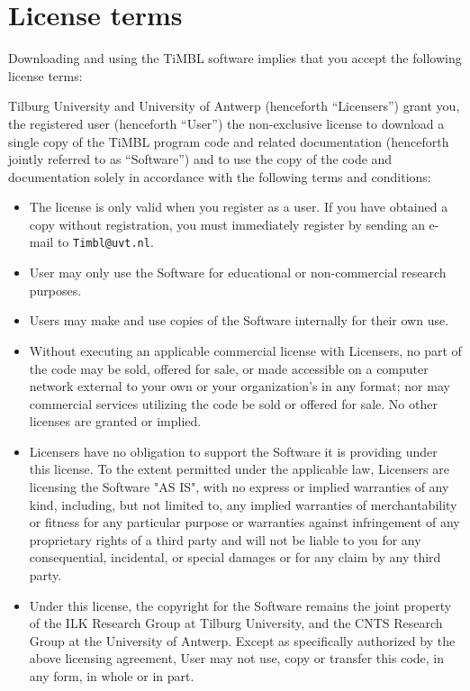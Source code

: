 \documentclass{report}
\begin{document}
\chapter{License terms}
\label{license}

Downloading and using the TiMBL software implies that you accept the
following license terms:

Tilburg University and University of Antwerp (henceforth
``Licensers'') grant you, the registered user (henceforth ``User'')
the non-exclusive license to download a single copy of the TiMBL
program code and related documentation (henceforth jointly referred to
as ``Software'') and to use the copy of the code and documentation
solely in accordance with the following terms and conditions:

\begin{itemize}

\item The license is only valid when you register as a user. If you
have obtained a copy without registration, you must immediately
register by sending an e-mail to {\tt Timbl@uvt.nl}.

\item User may only use the Software for educational or non-commercial
research purposes.

\item Users may make and use copies of the Software internally for
their own use.

\item Without executing an applicable commercial license with
Licensers, no part of the code may be sold, offered for sale, or made
accessible on a computer network external to your own or your
organization's in any format; nor may commercial services utilizing
the code be sold or offered for sale. No other licenses are granted or
implied.

\item Licensers have no obligation to support the Software it is
providing under this license.  To the extent permitted under the
applicable law, Licensers are licensing the Software "AS IS", with no
express or implied warranties of any kind, including, but not limited
to, any implied warranties of merchantability or fitness for any
particular purpose or warranties against infringement of any
proprietary rights of a third party and will not be liable to you for
any consequential, incidental, or special damages or for any claim by
any third party.

\item Under this license, the copyright for the Software remains the
joint property of the ILK Research Group at Tilburg University, and
the CNTS Research Group at the University of Antwerp.  Except as
specifically authorized by the above licensing agreement, User may not
use, copy or transfer this code, in any form, in whole or in part.


\end{itemize}
\end{document}
